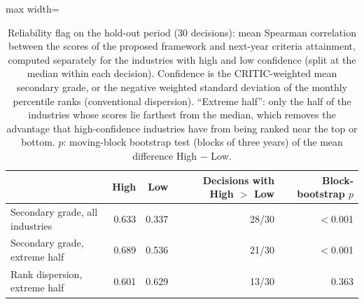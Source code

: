 \begin{table}[!htbp]
\centering
\footnotesize
\caption{Reliability flag on the hold-out period (30 decisions): mean Spearman correlation between the scores of the proposed framework and next-year criteria attainment, computed separately for the industries with high and low confidence (split at the median within each decision). Confidence is the CRITIC-weighted mean secondary grade, or the negative weighted standard deviation of the monthly percentile ranks (conventional dispersion). ``Extreme half'': only the half of the industries whose scores lie farthest from the median, which removes the advantage that high-confidence industries have from being ranked near the top or bottom. $p$: moving-block bootstrap test (blocks of three years) of the mean difference High $-$ Low.}\label{tab:reliability}
\begin{adjustbox}{max width=\textwidth}
\begin{tabular}{lrrrr}
\toprule
 & High & Low & Decisions with High $>$ Low & Block-bootstrap $p$ \\
\midrule
Secondary grade, all industries & 0.633 & 0.337 & 28/30 & $<$0.001 \\
Secondary grade, extreme half & 0.689 & 0.536 & 21/30 & $<$0.001 \\
Rank dispersion, extreme half & 0.601 & 0.629 & 13/30 & 0.363 \\
\bottomrule
\end{tabular}
\end{adjustbox}
\end{table}
